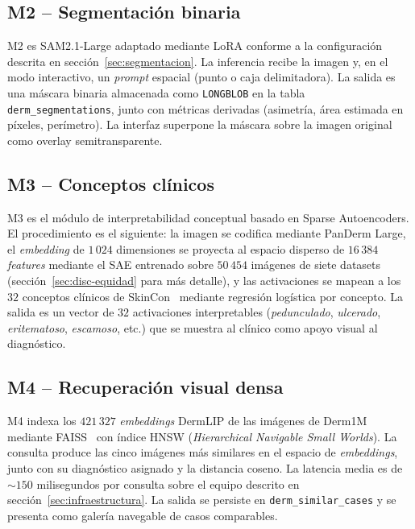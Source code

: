 \subsection{M2 -- Segmentación binaria}
\label{sec:dermapixel-m2}

M2 es SAM2.1-Large adaptado mediante LoRA conforme a la
configuración descrita en secci\'on~\ref{sec:segmentacion}. La inferencia
recibe la imagen y, en el modo interactivo, un \emph{prompt}
espacial (punto o caja delimitadora). La salida es una máscara
binaria almacenada como \texttt{LONGBLOB} en la tabla
\texttt{derm\_segmentations}, junto con métricas derivadas
(asimetría, área estimada en píxeles, perímetro). La interfaz
superpone la máscara sobre la imagen original como overlay
semitransparente.

\subsection{M3 -- Conceptos clínicos}
\label{sec:dermapixel-m3}

M3 es el módulo de interpretabilidad conceptual basado en Sparse
Autoencoders. El procedimiento es el siguiente: la imagen se
codifica mediante PanDerm Large, el \emph{embedding} de
$1\,024$ dimensiones se proyecta al espacio disperso de
$16\,384$ \emph{features} mediante el SAE entrenado sobre
$50\,454$ imágenes de siete datasets (secci\'on~\ref{sec:disc-equidad}
para más detalle), y las activaciones se mapean a los $32$
conceptos clínicos de SkinCon~\cite{skincon} mediante regresión
logística por concepto. La salida es un vector de $32$
activaciones interpretables (\emph{pedunculado}, \emph{ulcerado},
\emph{eritematoso}, \emph{escamoso}, etc.) que se muestra al
clínico como apoyo visual al diagnóstico.

\subsection{M4 -- Recuperación visual densa}
\label{sec:dermapixel-m4}

M4 indexa los $421\,327$ \emph{embeddings} DermLIP de las
imágenes de Derm1M mediante FAISS~\cite{faiss2019} con índice HNSW
(\emph{Hierarchical Navigable Small Worlds}). La consulta produce
las cinco imágenes más similares en el espacio de
\emph{embeddings}, junto con su diagnóstico asignado y la distancia
coseno. La latencia media es de $\sim 150$ milisegundos por
consulta sobre el equipo descrito en secci\'on~\ref{sec:infraestructura}.
La salida se persiste en \texttt{derm\_similar\_cases} y se
presenta como galería navegable de casos comparables.

